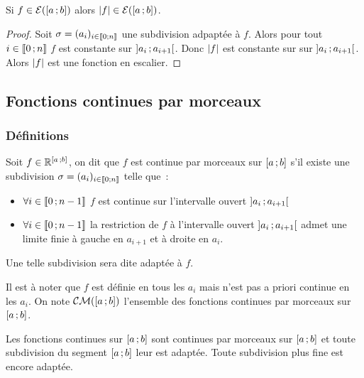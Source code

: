 \begin{prop}
  Si \(f \in \mathcal{E}(\left[ a \, ; {} b \right])\) alors \(\left\lvert f\right\rvert \in 
  \mathcal{E}(\left[ a \, ; {} b \right])\).
\end{prop}
\begin{proof}
  Soit \(\sigma=(a_i)_{i \in \mathopen{\llbracket}0\mathclose{}\mathpunct{};n\mathclose{\rrbracket}}\) une subdivision adpaptée 
  à \(f\). Alors pour tout \(i \in \mathopen{\llbracket}0\mathclose{}\mathpunct{};n\mathclose{\rrbracket}\) \(f\) est constante 
  sur \(\left] a_i \, ; {} a_{i+1} \right[\). Donc \(\left\lvert f\right\rvert\) est constante sur sur 
  \(\left] a_i \, ; {} a_{i+1} \right[\). Alors \(\left\lvert f\right\rvert\) est une fonction en 
  escalier.
\end{proof}

\subsection{Fonctions continues par morceaux}

\subsubsection{Définitions}

\begin{defdef}
  Soit \(f \in \mathbb{R}^{\left[ a \, ; {} b \right]}\), on dit que \(f\) est continue par 
  morceaux sur \(\left[ a \, ; {} b \right]\) s'il existe une subdivision 
  \(\sigma=(a_i)_{i \in \mathopen{\llbracket}0\mathclose{}\mathpunct{};n\mathclose{\rrbracket}}\) telle que~:
  \begin{itemize}
    \item \(\forall i \in \mathopen{\llbracket}0\mathclose{}\mathpunct{};n-1\mathclose{\rrbracket}\) \(f\) est continue sur 
      l'intervalle ouvert \(\left] a_i \, ; {} a_{i+1} \right[\)
    \item \(\forall i \in \mathopen{\llbracket}0\mathclose{}\mathpunct{};n-1\mathclose{\rrbracket}\) la restriction de \(f\) à 
      l'intervalle ouvert \(\left] a_i \, ; {} a_{i+1} \right[\) admet une limite finie 
      à gauche en \(a_{i+1}\) et à droite en \(a_i\).
  \end{itemize}
  Une telle subdivision sera dite adaptée à \(f\).
\end{defdef}

Il est à noter que \(f\) est définie en tous les \(a_i\) mais n'est pas a priori 
continue en les \(a_i\). On note \(\mathcal{CM}(\left[ a \, ; {} b \right])\) l'ensemble des 
fonctions continues par morceaux sur \(\left[ a \, ; {} b \right]\). 

Les fonctions continues sur \(\left[ a \, ; {} b \right]\) sont continues par morceaux 
sur \(\left[ a \, ; {} b \right]\) et toute subdivision du segment 
\(\left[ a \, ; {} b \right]\) leur est adaptée. Toute subdivision plus fine est encore 
adaptée.

